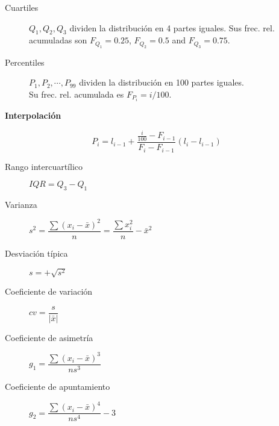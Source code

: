 \begin{multicols*}{2}
\begin{tcolorbox}[hbox, title=Estadísticos de posición]
\begin{minipage}{0.4\textwidth}
\begin{description}
\item [Cuartiles] $Q_1,Q_2,Q_3$ dividen la distribución en 4 partes iguales.
      Sus frec. rel. acumuladas son
      $F_{Q_1}=0.25$, $F_{Q_2}=0.5$ and $F_{Q_3}=0.75$.
\item [Percentiles] $P_1,P_2,\cdots,P_{99}$ dividen la distribución en 100 partes iguales.\\
      Su frec. rel. acumulada es $F_{P_i}=i/100$.
\end{description}
\textbf{Interpolación}

\resizebox{\textwidth}{!}{}

\[P_i=l_{i-1}+\frac{\frac{i}{100}-F_{i-1}}{F_i-F_{i-1}}(l_i-l_{i-1})\]
\end{minipage}
\end{tcolorbox}

\begin{tcolorbox}[hbox, title=Estadísticos de dispersión]
\begin{minipage}{0.4\textwidth}
\begin{description}
\item [Rango intercuartílico] $IQR=Q_3-Q_1$
\item [Varianza] $s^2=\dfrac{\sum (x_i-\bar x)^2}{n}=\dfrac{\sum x_i^2}{n}-\bar x^2$
\item [Desviación típica] $s=+\sqrt{s^2}$
\item [Coeficiente de variación] $cv=\dfrac{s}{|\bar{x}|}$
\end{description}
\end{minipage}
\end{tcolorbox}

\begin{tcolorbox}[hbox, title=Estadísticos de forma]
\begin{minipage}{0.4\textwidth}
\begin{description}
\item [Coeficiente de asimetría] $g_1=\dfrac{\sum(x_i-\bar{x})^3}{ns^3}$
\item [Coeficiente de apuntamiento] $g_2=\dfrac{\sum(x_i-\bar{x})^4}{ns^4}-3$
\end{description}
\end{minipage}
\end{tcolorbox}


\end{multicols*}
